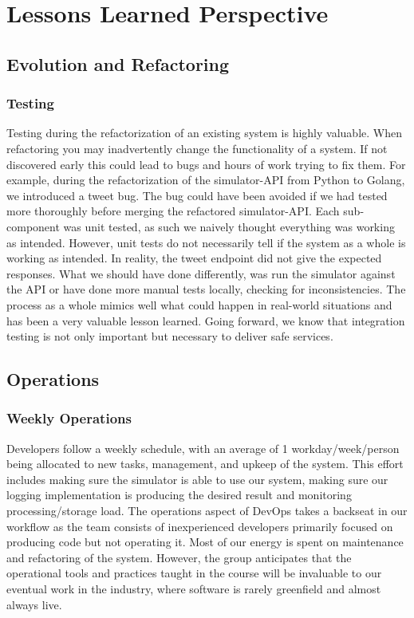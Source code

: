 \section{Lessons Learned Perspective}

\subsection{Evolution and Refactoring}

\subsubsection{Testing}
Testing during the refactorization of an existing system is highly valuable. When refactoring you may inadvertently change the functionality of a system. If not discovered early this could lead to bugs and hours of work trying to fix them. For example, during the refactorization of the simulator-API from Python to Golang, we introduced a tweet bug. The bug could have been avoided if we had tested more thoroughly before merging the refactored simulator-API. Each sub-component was unit tested, as such we naively thought everything was working as intended. However, unit tests do not necessarily tell if the system as a whole is working as intended. In reality, the tweet endpoint did not give the expected responses. What we should have done differently, was run the simulator against the API or have done more manual tests locally, checking for inconsistencies. The process as a whole mimics well what could happen in real-world situations and has been a very valuable lesson learned. Going forward, we know that integration testing is not only important but necessary to deliver safe services.

\subsection{Operations}

\subsubsection{Weekly Operations}
Developers follow a weekly schedule, with an average of 1 workday/week/person being allocated to new tasks, management, and upkeep of the system. This effort includes making sure the simulator is able to use our system, making sure our logging implementation is producing the desired result and monitoring processing/storage load. The operations aspect of DevOps takes a backseat in our workflow as the team consists of inexperienced developers primarily focused on producing code but not operating it. Most of our energy is spent on maintenance and refactoring of the system. However, the group anticipates that the operational tools and practices taught in the course will be invaluable to our eventual work in the industry, where software is rarely greenfield and almost always live. 

